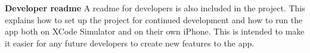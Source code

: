 \documentclass{l4proj}
\begin{document}
\textbf{Developer readme} A readme for developers is also included in the project. This explains how to set up the project for continued development and how to run the app both on XCode Simulator and on their own iPhone. This is intended to make it easier for any future developers to create new features to the app. 




\end{document}
